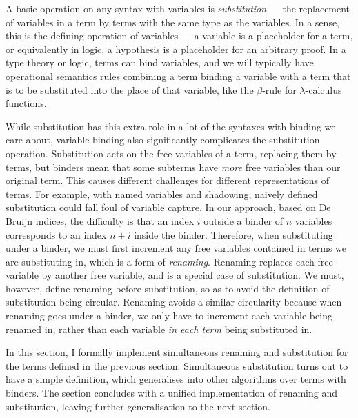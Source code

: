 \def\SimpleKits{../agda/processed-latex/SimpleKits.tex}

%

A basic operation on any syntax with variables is \emph{substitution} --- the
replacement of variables in a term by terms with the same type as the variables.
In a sense, this is the defining operation of variables --- a variable is a
placeholder for a term, or equivalently in logic, a hypothesis is a placeholder
for an arbitrary proof.
In a type theory or logic, terms can bind variables, and we will typically have
operational semantics rules combining a term binding a variable with a term that
is to be substituted into the place of that variable, like the $\beta$-rule for
$\lambda$-calculus functions.

While substitution has this extra role in a lot of the syntaxes with binding we
care about, variable binding also significantly complicates the substitution
operation.
Substitution acts on the free variables of a term, replacing them by terms, but
binders mean that some subterms have \emph{more} free variables than our
original term.
This causes different challenges for different representations of terms.
For example, with named variables and shadowing, na\"{i}vely defined
substitution could fall foul of variable capture.
In our approach, based on De Bruijn indices, the difficulty is that an index $i$
outside a binder of $n$ variables corresponds to an index $n + i$ inside the
binder.
Therefore, when substituting under a binder, we must first increment any free
variables contained in terms we are substituting in, which is a form of
\emph{renaming}.
Renaming replaces each free variable by another free variable, and is a special
case of substitution.
We must, however, define renaming before substitution, so as to avoid the
definition of substitution being circular.
Renaming avoids a similar circularity because when renaming goes under a binder,
we only have to increment each variable being renamed in, rather than each
variable \emph{in each term} being substituted in.

In this section, I formally implement simultaneous renaming and substitution for
the terms defined in the previous section.
Simultaneous substitution turns out to have a simple definition, which
generalises into other algorithms over terms with binders.
The section concludes with a unified implementation of renaming and
substitution, leaving further generalisation to the next section.

